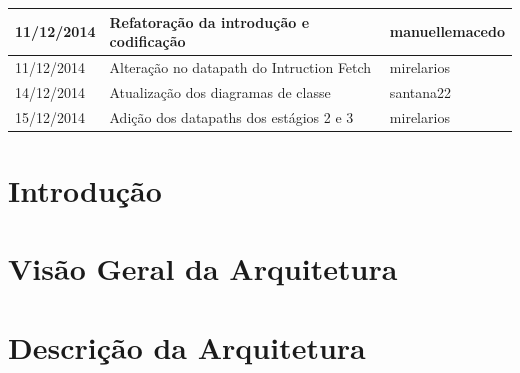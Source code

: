 \documentclass{report}
\begin{document}
\begin{table}[h!]
\begin{longtable}[pos]{|m{2cm} | m{7.2cm} | m{3.8cm}|}
      \small 11/12/2014 & \small Refatoração da introdução e codificação & \small manuellemacedo \\ \hline
      \small 11/12/2014 & \small Alteração no datapath do Intruction Fetch  & \small mirelarios \\ \hline
      \small 14/12/2014 & \small Atualização dos diagramas de classe & \small santana22 \\ \hline
      \small 15/12/2014 & \small Adição dos datapaths dos estágios 2 e 3 & \small mirelarios \\ \hline
	\end{longtable}
	\end{table}

\tableofcontents

\chapter{Introdução}
  
	

\chapter{Visão Geral da Arquitetura}

%	
	
	
	
	

\chapter{Descrição da Arquitetura}

	
	\newpage
	
	
	\newpage
	
		
	\newpage
	
	
	\newpage
	
\end{document}
